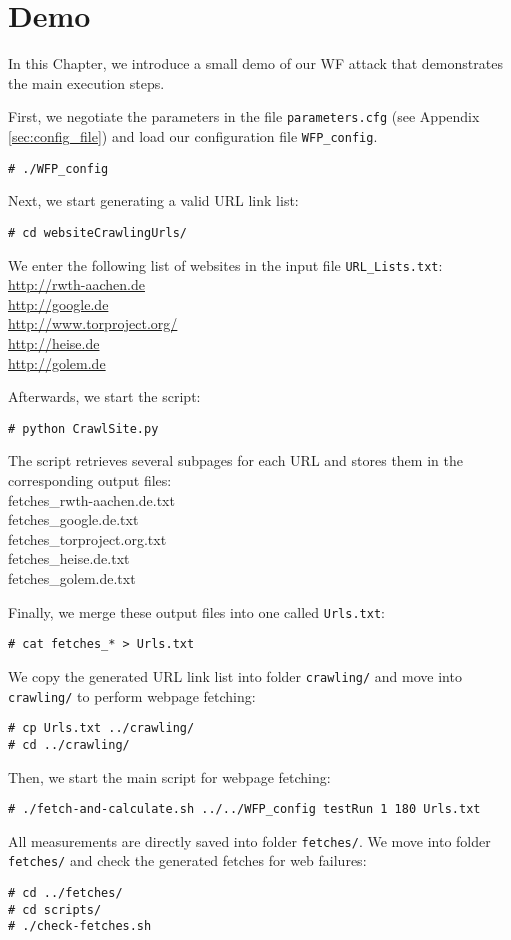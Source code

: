 \chapter{Demo}
\label{chap:example}

In this Chapter, we introduce a small demo of our \ac{WF} attack that demonstrates the main execution steps.

First, we negotiate the parameters in the file \texttt{parameters.cfg} (see Appendix \ref{sec:config_file}) and load our configuration file \texttt{WFP\_config}.
\begin{verbatim}
# ./WFP_config
\end{verbatim}
Next, we start generating a valid \ac{URL} link list:
\begin{verbatim}
# cd websiteCrawlingUrls/
\end{verbatim}
We enter the following list of websites in the input file \texttt{URL\_Lists.txt}:\\[1mm]
\url{http://rwth-aachen.de}\\
\url{http://google.de}\\
\url{http://www.torproject.org/}\\
\url{http://heise.de}\\
\url{http://golem.de}

Afterwards, we start the script:
\begin{verbatim}
# python CrawlSite.py
\end{verbatim}
The script retrieves several subpages for each \ac{URL} and stores them in the corresponding output files:\\[1mm]
fetches\_rwth-aachen.de.txt\\
fetches\_google.de.txt\\
fetches\_torproject.org.txt\\
fetches\_heise.de.txt\\
fetches\_golem.de.txt

Finally, we merge these output files into one called \texttt{Urls.txt}:
\begin{verbatim}
# cat fetches_* > Urls.txt
\end{verbatim}

We copy the generated \ac{URL} link list into folder \texttt{crawling/} and move into \texttt{crawling/} to perform webpage fetching:
\begin{verbatim}
# cp Urls.txt ../crawling/
# cd ../crawling/
\end{verbatim}
Then, we start the main script for webpage fetching:
\begin{verbatim}
# ./fetch-and-calculate.sh ../../WFP_config testRun 1 180 Urls.txt 
\end{verbatim}
All measurements are directly saved into folder \texttt{fetches/}. We move into folder \texttt{fetches/} and check the generated fetches for web failures:
\begin{verbatim}
# cd ../fetches/
# cd scripts/
# ./check-fetches.sh
\end{verbatim}

